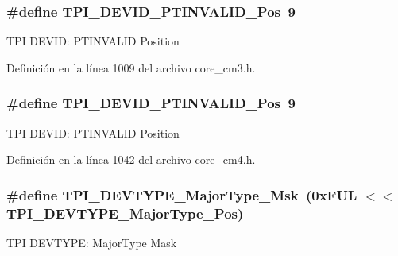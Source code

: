 \subsubsection[{\texorpdfstring{T\+P\+I\+\_\+\+D\+E\+V\+I\+D\+\_\+\+P\+T\+I\+N\+V\+A\+L\+I\+D\+\_\+\+Pos}{TPI_DEVID_PTINVALID_Pos}}]{\setlength{\rightskip}{0pt plus 5cm}\#define T\+P\+I\+\_\+\+D\+E\+V\+I\+D\+\_\+\+P\+T\+I\+N\+V\+A\+L\+I\+D\+\_\+\+Pos~9}\hypertarget{group___c_m_s_i_s___t_p_i_ga974cccf4c958b4a45cb71c7b5de39b7b}{}\label{group___c_m_s_i_s___t_p_i_ga974cccf4c958b4a45cb71c7b5de39b7b}
T\+PI D\+E\+V\+ID\+: P\+T\+I\+N\+V\+A\+L\+ID Position 

Definición en la línea 1009 del archivo core\+\_\+cm3.\+h.

\subsubsection[{\texorpdfstring{T\+P\+I\+\_\+\+D\+E\+V\+I\+D\+\_\+\+P\+T\+I\+N\+V\+A\+L\+I\+D\+\_\+\+Pos}{TPI_DEVID_PTINVALID_Pos}}]{\setlength{\rightskip}{0pt plus 5cm}\#define T\+P\+I\+\_\+\+D\+E\+V\+I\+D\+\_\+\+P\+T\+I\+N\+V\+A\+L\+I\+D\+\_\+\+Pos~9}\hypertarget{group___c_m_s_i_s___t_p_i_ga974cccf4c958b4a45cb71c7b5de39b7b}{}\label{group___c_m_s_i_s___t_p_i_ga974cccf4c958b4a45cb71c7b5de39b7b}
T\+PI D\+E\+V\+ID\+: P\+T\+I\+N\+V\+A\+L\+ID Position 

Definición en la línea 1042 del archivo core\+\_\+cm4.\+h.

\subsubsection[{\texorpdfstring{T\+P\+I\+\_\+\+D\+E\+V\+T\+Y\+P\+E\+\_\+\+Major\+Type\+\_\+\+Msk}{TPI_DEVTYPE_MajorType_Msk}}]{\setlength{\rightskip}{0pt plus 5cm}\#define T\+P\+I\+\_\+\+D\+E\+V\+T\+Y\+P\+E\+\_\+\+Major\+Type\+\_\+\+Msk~(0x\+F\+U\+L $<$$<$ T\+P\+I\+\_\+\+D\+E\+V\+T\+Y\+P\+E\+\_\+\+Major\+Type\+\_\+\+Pos)}\hypertarget{group___c_m_s_i_s___t_p_i_gaecbceed6d08ec586403b37ad47b38c88}{}\label{group___c_m_s_i_s___t_p_i_gaecbceed6d08ec586403b37ad47b38c88}
T\+PI D\+E\+V\+T\+Y\+PE\+: Major\+Type Mask 

